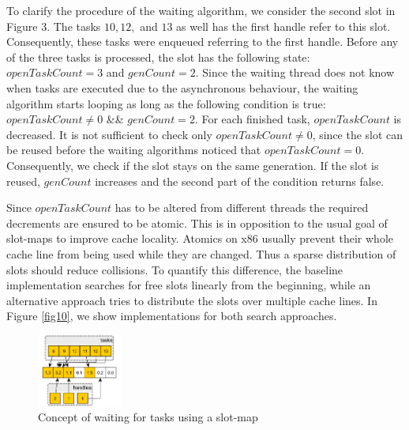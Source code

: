 \documentclass[conference]{IEEEtran}
\begin{document}
To clarify the procedure of the waiting algorithm, we consider the second slot in Figure 3. The tasks $10, 12, $ and $13$ as well has the first handle refer to this slot. Consequently, these tasks were enqueued referring to the first handle. Before any of the three tasks is processed, the slot has the following state: $openTaskCount = 3$ and $genCount =  2$. Since the waiting thread does not know when tasks are executed due to the asynchronous behaviour, the waiting algorithm starts looping as long as the following condition is true: $openTaskCount \neq 0$ \&\& $genCount = 2$. For each finished task, $openTaskCount$ is decreased. It is not sufficient to check only $openTaskCount \neq 0$, since the slot can be reused before the waiting algorithms noticed that $openTaskCount = 0$. Consequently, we check if the slot stays on the same generation. If the slot is reused, $genCount$ increases and the second part of the condition returns false.

Since $openTaskCount$ has to be altered from different threads the required decrements are ensured to be atomic. This is in opposition to the usual goal of slot-maps to improve cache locality. Atomics on x86 usually prevent their whole cache line from being used while they are changed. Thus a sparse distribution of slots should reduce collisions. To quantify this difference, the baseline implementation searches for free slots linearly from the beginning, while an alternative approach tries to distribute the slots over multiple cache lines. In Figure \ref{fig10}, we show implementations for both search approaches.

\begin{figure}
\centering	\includegraphics[width=0.25\textwidth]{img/waitingconcept.png}
	\caption{Concept of waiting for tasks using a slot-map}
	\label{fig2}
\end{figure}
\end{document}
